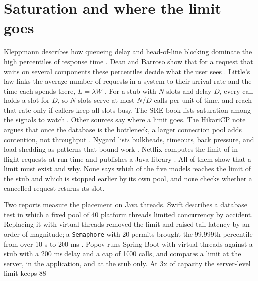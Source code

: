 \section{Saturation and where the limit goes}

Kleppmann describes how queueing delay and head-of-line blocking dominate the high percentiles of response time \cite{ref9}. Dean and Barroso show that for a request that waits on several components these percentiles decide what the user sees \cite{ref10}. Little’s law links the average number of requests in a system to their arrival rate and the time each spends there, $L = \lambda W$ \cite{ref11}. For a stub with $N$ slots and delay $D$, every call holds a slot for $D$, so $N$ slots serve at most $N/D$ calls per unit of time, and reach that rate only if callers keep all slots busy. The SRE book lists saturation among the signals to watch \cite{ref12}. Other sources say where a limit goes. The HikariCP note argues that once the database is the bottleneck, a larger connection pool adds contention, not throughput \cite{ref13}. Nygard lists bulkheads, timeouts, back pressure, and load shedding as patterns that bound work \cite{ref14}. Netflix computes the limit of in-flight requests at run time and publishes a Java library \cite{ref15}. All of them show that a limit must exist and why. None says which of the five models reaches the limit of the stub and which is stopped earlier by its own pool, and none checks whether a cancelled request returns its slot.

Two reports measure the placement on Java threads. Swift describes a database test in which a fixed pool of 40 platform threads limited concurrency by accident. Replacing it with virtual threads removed the limit and raised tail latency by an order of magnitude; a \texttt{Semaphore} with 20 permits brought the 99.999th percentile from over 10 s to 200 ms \cite{ref16}. Popov runs Spring Boot with virtual threads against a stub with a 200 ms delay and a cap of 1000 calls, and compares a limit at the server, in the application, and at the stub only. At 3x of capacity the server-level limit keeps 88%

